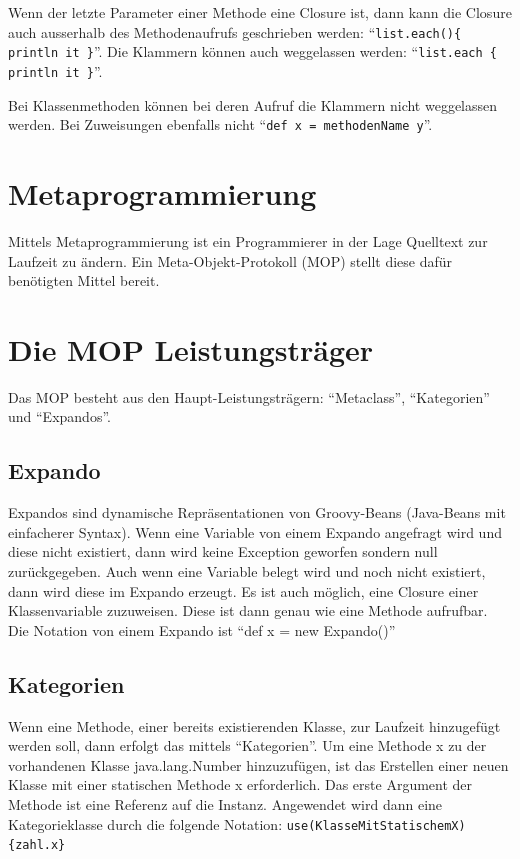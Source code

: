 \documentclass[11pt,english,ngerman, headsepline]{scrreprt}
\begin{document}
Wenn der letzte Parameter einer Methode eine Closure ist, dann kann die
Closure auch ausserhalb des Methodenaufrufs geschrieben werden:
``\texttt{list.each()\{ println it \}}''. Die Klammern können auch weggelassen
werden: ``\texttt{list.each \{ println it \}}''.  
  
Bei Klassenmethoden können bei deren Aufruf die
Klammern nicht weggelassen werden. Bei Zuweisungen ebenfalls nicht ``\texttt{def
x = methodenName y}''.
   
 
\section{Metaprogrammierung}\label{metaprogrammingLabel}

Mittels Metaprogrammierung ist ein Programmierer in der Lage Quelltext zur
Laufzeit zu ändern. Ein Meta-Objekt-Protokoll (MOP) stellt diese dafür
benötigten Mittel bereit.
 
 

\section{Die MOP Leistungsträger}
Das MOP besteht aus den Haupt-Leistungsträgern: ``Metaclass'',
``Kategorien'' und ``Expandos''.

\subsection{Expando}\label{expando}

Expandos sind dynamische Repräsentationen von Groovy-Beans (Java-Beans mit
einfacherer Syntax).
Wenn eine Variable von einem Expando angefragt wird und diese nicht existiert, dann wird
keine Exception geworfen sondern null zurückgegeben. Auch wenn eine Variable
belegt wird und noch nicht existiert, dann wird diese im Expando erzeugt.
Es ist auch möglich, eine Closure einer Klassenvariable zuzuweisen.
Diese ist dann genau wie eine Methode aufrufbar. Die Notation von einem
Expando ist ``def x = new Expando()''

\subsection{Kategorien}

Wenn eine Methode, einer bereits existierenden Klasse, zur Laufzeit hinzugefügt
werden soll, dann erfolgt das mittels ``Kategorien''.
Um eine Methode x zu der vorhandenen Klasse java.lang.Number hinzuzufügen, ist
das Erstellen einer neuen Klasse mit einer statischen Methode x erforderlich.
Das erste Argument der Methode ist eine Referenz auf die Instanz.
Angewendet wird dann eine Kategorieklasse durch die folgende Notation:
\texttt{use(KlasseMitStatischemX)\{zahl.x\}}
\end{document}
